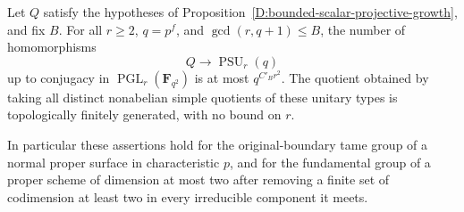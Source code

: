 \begin{corollary}
\label{D:bounded-centre-unitary-simple-product}
Let $Q$ satisfy the hypotheses of
Proposition~\ref{D:bounded-scalar-projective-growth}, and fix $B$.
For all $r\ge2$, $q=p^f$, and $\gcd(r,q+1)\le B$, the number of
homomorphisms
\[
           Q\longrightarrow\operatorname{PSU}_r(q)
\]
up to conjugacy in $\operatorname{PGL}_r(\mathbf F_{q^2})$ is
at most $q^{C'_Br^2}$. The quotient obtained by taking all distinct
nonabelian simple quotients of these unitary types is
topologically finitely generated, with no bound on $r$.

In particular these assertions hold for the original-boundary tame
group of a normal proper surface in characteristic $p$, and for
the fundamental group of a proper scheme of dimension at most two
after removing a finite set of codimension at least two in every
irreducible component it meets.
\end{corollary}
